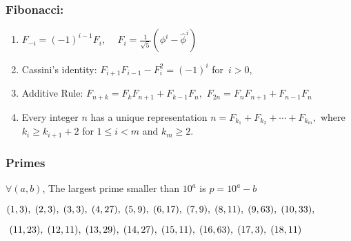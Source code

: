 \documentclass[12pt]{extarticle}
\begin{document}
\begin{multicols*}{2}
		\subsubsection*{Fibonacci:}
	\begin{enumerate}
		\itemsep0em 
		\item $F_{-i} = (-1)^{i-1} F_i$,  $ \quad F_i = \frac{1}{\sqrt{5}} \left(\phi^i - \hat{\phi}^i\right)$
		\item Cassini's identity: $F_{i+1} F_{i-1} - F^2_i = (-1)^i$ \quad \hbox{for $i > 0$,}
		\item Additive Rule:
		\hspace{2mm}
		$F_{n+k} = F_k F_{n+1} + F_{k-1} F_n,$ \hspace{2mm}
		$F_{2n} = F_n F_{n+1} + F_{n-1} F_n$
		
		\item Every integer $n$ has a unique representation
		$ n = F_{k_1} + F_{k_2} + \cdots + F_{k_m},$
		where $k_i \geq k_{i+1} + 2$ for $1 \leq i < m$ and $k_m \geq 2$.
	\end{enumerate}
	\subsubsection*{Primes}
	$\forall (a,b)$, The largest prime smaller than $10^a$ is $p = 10^{a} - b$
	\newline 
	\par
	$(1,3), \hspace{1mm}(2,3), \hspace{1mm}(3,3), \hspace{1mm}(4,27), \hspace{1mm}(5,9), \hspace{1mm}(6,17), \hspace{1mm}(7,9), \hspace{1mm}(8,11), \hspace{1mm}(9,63), \hspace{1mm}(10,33),$
		\newline 
	\par
	$ \hspace{1mm}(11,23), \hspace{1mm}(12,11), \hspace{1mm}(13,29), \hspace{1mm}(14,27), \hspace{1mm}(15,11), \hspace{1mm}(16,63), \hspace{1mm}(17,3), \hspace{1mm}(18,11)$
	\par\vskip 3pt
	
	
	\vfill

		\end{multicols*}
\end{document}
